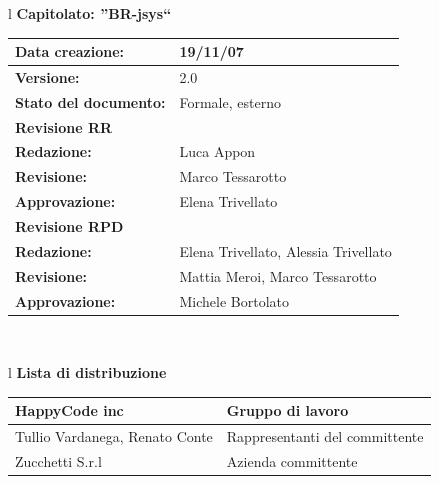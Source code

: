 \documentclass[11pt,titlepage,a4paper]{report}
\begin{document}
\begin{center}
\thispagestyle{plain}
\begin{table}[htbp]
\large{
\begin{tabular}{l}
\Large{\textbf{\textsf{Capitolato: ''BR-jsys``}}} \\
\begin{tabular}{||p{6cm}||p{6cm}||} \hline
\textbf{Data creazione:} & 19/11/07 \\ \hline
\textbf{Versione:} & 2.0 \\ \hline
\textbf{Stato del documento:} & Formale, esterno \\ \hline
\textbf{Revisione RR}     \\ \hline
\textbf{Redazione:} & Luca Appon \\ \hline
\textbf{Revisione:} & Marco Tessarotto   \\ \hline
\textbf{Approvazione:}  & Elena Trivellato \\ \hline
\textbf{Revisione RPD}     \\ \hline
\textbf{Redazione:} & Elena Trivellato, Alessia Trivellato \\ \hline
\textbf{Revisione:} & Mattia Meroi, Marco Tessarotto \\ \hline
\textbf{Approvazione:}  & Michele Bortolato \\ \hline

\end{tabular} \\
\end{tabular}
}
\end{table}

\begin{table}[hbtp]
\large{
\begin{tabular}{l}
\Large{\textbf{\textsf{Lista di distribuzione}}} \\
\begin{tabular}{||p{6cm}||p{6cm}||} \hline
{HappyCode inc}& Gruppo di lavoro\\ \hline
{Tullio Vardanega, Renato Conte}& Rappresentanti del committente \\ \hline
{Zucchetti S.r.l}& Azienda committente\\ \hline
\end{tabular} \\
\end{tabular}
}
\end{table}


\end{center}
\end{document}

